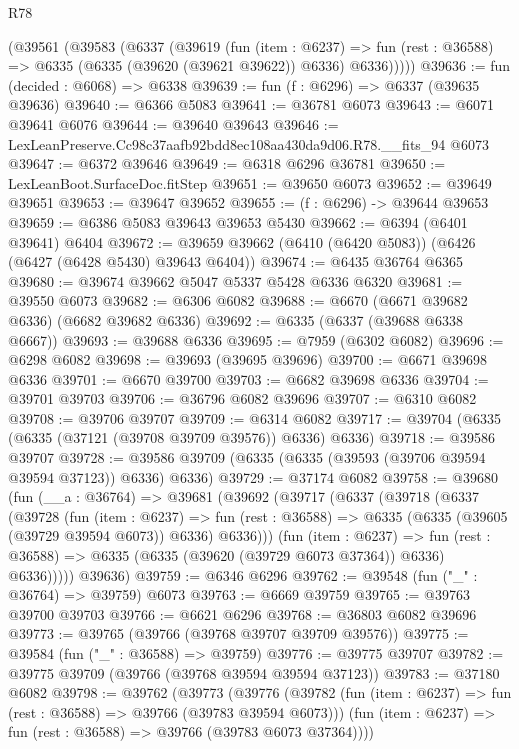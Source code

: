 \begin{lexlean}{R78}
\begin{coremodule}
    (@39561
      (@39583
        (@6337
          (@39619
            (fun (item : @6237) =>
            fun (rest : @36588) => @6335 (@6335 (@39620 (@39621 @39622)) @6336) @6336)))))
@39636 := fun (decided : @6068) => @6338
@39639 := fun (f : @6296) => @6337 (@39635 @39636)
@39640 := @6366 @5083
@39641 := @36781 @6073
@39643 := @6071 @39641 @6076
@39644 := @39640 @39643
@39646 := LexLeanPreserve.Cc98c37aafb92bdd8ec108aa430da9d06.R78.__fits_94 @6073
@39647 := @6372 @39646
@39649 := @6318 @6296 @36781
@39650 := LexLeanBoot.SurfaceDoc.fitStep
@39651 := @39650 @6073
@39652 := @39649 @39651
@39653 := @39647 @39652
@39655 := (f : @6296) -> @39644 @39653
@39659 := @6386 @5083 @39643 @39653 @5430
@39662 := @6394 (@6401 @39641) @6404
@39672 := @39659 @39662 (@6410 (@6420 @5083)) (@6426 (@6427 (@6428 @5430) @39643 @6404))
@39674 := @6435 @36764 @6365
@39680 := @39674 @39662 @5047 @5337 @5428 @6336 @6320
@39681 := @39550 @6073
@39682 := @6306 @6082
@39688 := @6670 (@6671 @39682 @6336) (@6682 @39682 @6336)
@39692 := @6335 (@6337 (@39688 @6338 @6667))
@39693 := @39688 @6336
@39695 := @7959 (@6302 @6082)
@39696 := @6298 @6082
@39698 := @39693 (@39695 @39696)
@39700 := @6671 @39698 @6336
@39701 := @6670 @39700
@39703 := @6682 @39698 @6336
@39704 := @39701 @39703
@39706 := @36796 @6082 @39696
@39707 := @6310 @6082
@39708 := @39706 @39707
@39709 := @6314 @6082
@39717 := @39704 (@6335 (@6335 (@37121 (@39708 @39709 @39576)) @6336) @6336)
@39718 := @39586 @39707
@39728 := @39586 @39709 (@6335 (@6335 (@39593 (@39706 @39594 @39594 @37123)) @6336) @6336)
@39729 := @37174 @6082
@39758 := @39680
    (fun (__a : @36764) =>
    @39681
      (@39692
        (@39717
          (@6337
            (@39718
              (@6337
                (@39728
                  (fun (item : @6237) =>
                  fun (rest : @36588) => @6335 (@6335 (@39605 (@39729 @39594 @6073)) @6336) @6336)))
              (fun (item : @6237) =>
              fun (rest : @36588) => @6335 (@6335 (@39620 (@39729 @6073 @37364)) @6336) @6336)))))
      @39636)
@39759 := @6346 @6296
@39762 := @39548 (fun ("_" : @36764) => @39759) @6073
@39763 := @6669 @39759
@39765 := @39763 @39700 @39703
@39766 := @6621 @6296
@39768 := @36803 @6082 @39696
@39773 := @39765 (@39766 (@39768 @39707 @39709 @39576))
@39775 := @39584 (fun ("_" : @36588) => @39759)
@39776 := @39775 @39707
@39782 := @39775 @39709 (@39766 (@39768 @39594 @39594 @37123))
@39783 := @37180 @6082
@39798 := @39762
    (@39773
      (@39776
        (@39782 (fun (item : @6237) => fun (rest : @36588) => @39766 (@39783 @39594 @6073)))
        (fun (item : @6237) => fun (rest : @36588) => @39766 (@39783 @6073 @37364))))

\end{coremodule}
\end{lexlean}
